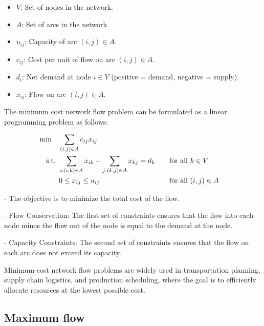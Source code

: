 \begin{itemize}
\item \( V \): Set of nodes in the network.
\item \( A \): Set of arcs in the network.
\end{itemize}

\begin{itemize}
\item \( u_{ij} \): Capacity of arc \( (i, j) \in A \).
\item \( c_{ij} \): Cost per unit of flow on arc \( (i, j) \in A \).
\item \( d_i \): Net demand at node \( i \in V \) (positive = demand, negative = supply).
\end{itemize}

\begin{itemize}
\item \( x_{ij} \): Flow on arc \( (i, j) \in A \).
\end{itemize}

The minimum cost network flow problem can be formulated as a linear programming problem as follows:

\begin{align*}
\min \quad & \sum_{(i, j) \in A} c_{ij} x_{ij} \\
\mbox{ s.t. }        & \sum_{i:(i, k) \in A} x_{ik} - \sum_{j:(k, j) \in A} x_{kj} = d_k &&\quad \mbox{for all } k \in V \\
& 0 \leq x_{ij} \leq u_{ij} &&\quad \mbox{for all } (i, j) \in A
\end{align*}

- The objective is to minimize the total cost of the flow.

- Flow Conservation: The first set of constraints ensures that the flow into each node minus the flow out of the node is equal to the demand at the node.

- Capacity Constraints: The second set of constraints ensures that the flow on each arc does not exceed its capacity.

Minimum-cost network flow problems are widely used in transportation planning, supply chain logistics, and production scheduling, where the goal is to efficiently allocate resources at the lowest possible cost.

\subsection{Maximum flow}
\label{sec:max-flow}

